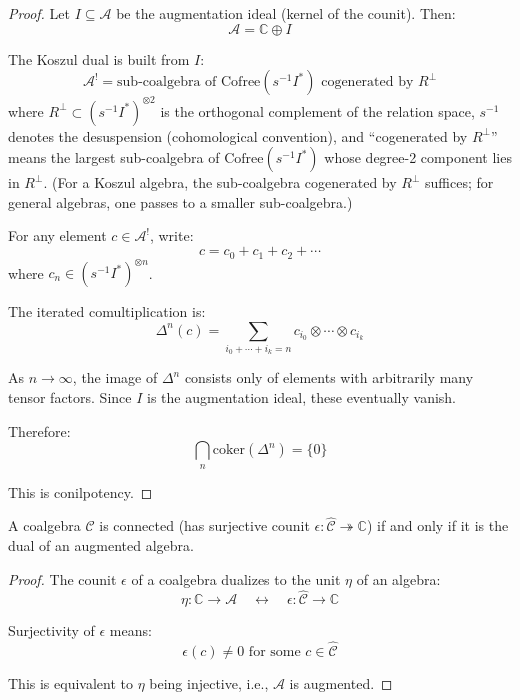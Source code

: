 \begin{proof}
Let $I \subseteq \mathcal{A}$ be the augmentation ideal (kernel of the counit). Then:
\[\mathcal{A} = \mathbb{C} \oplus I\]

The Koszul dual is built from $I$:
\[\mathcal{A}^! = \text{sub-coalgebra of } \text{Cofree}(s^{-1}I^*) \text{ cogenerated by } R^\perp\]
where $R^\perp \subset (s^{-1}I^*)^{\otimes 2}$ is the orthogonal complement of the relation space, $s^{-1}$ denotes the desuspension (cohomological convention), and ``cogenerated by $R^\perp$'' means the largest sub-coalgebra of $\text{Cofree}(s^{-1}I^*)$ whose degree-2 component lies in $R^\perp$.  (For a Koszul algebra, the sub-coalgebra cogenerated by $R^\perp$ suffices; for general algebras, one passes to a smaller sub-coalgebra.)

For any element $c \in \mathcal{A}^!$, write:
\[c = c_0 + c_1 + c_2 + \cdots\]
where $c_n \in (s^{-1}I^*)^{\otimes n}$.

The iterated comultiplication is:
\[\Delta^n(c) = \sum_{i_0 + \cdots + i_k = n} c_{i_0} \otimes \cdots \otimes c_{i_k}\]

As $n \to \infty$, the image of $\Delta^n$ consists only of elements with arbitrarily 
many tensor factors. Since $I$ is the augmentation ideal, these eventually vanish.

Therefore:
\[\bigcap_n \text{coker}(\Delta^n) = \{0\}\]

This is conilpotency.
\end{proof}

\begin{lemma}\label{lem:connectedness-augmentation}
A coalgebra $\widehat{\mathcal{C}}$ is connected (has surjective counit $\epsilon: \widehat{\mathcal{C}} 
\twoheadrightarrow \mathbb{C}$) if and only if it is the dual of an augmented algebra.
\end{lemma}

\begin{proof}
The counit $\epsilon$ of a coalgebra dualizes to the unit $\eta$ of an algebra:
\[\eta: \mathbb{C} \to \mathcal{A} \quad \leftrightarrow \quad \epsilon: \widehat{\mathcal{C}} 
\to \mathbb{C}\]

Surjectivity of $\epsilon$ means:
\[\epsilon(c) \neq 0 \text{ for some } c \in \widehat{\mathcal{C}}\]

This is equivalent to $\eta$ being injective, i.e., $\mathcal{A}$ is augmented.
\end{proof}

